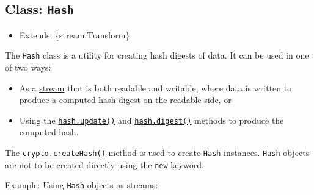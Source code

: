 \subsection{\texorpdfstring{Class:
\texttt{Hash}}{Class: Hash}}\label{class-hash}

\begin{itemize}
\tightlist
\item
  Extends: \{stream.Transform\}
\end{itemize}

The \texttt{Hash} class is a utility for creating hash digests of data.
It can be used in one of two ways:

\begin{itemize}
\tightlist
\item
  As a \href{stream.md}{stream} that is both readable and writable,
  where data is written to produce a computed hash digest on the
  readable side, or
\item
  Using the
  \hyperref[hashupdatedata-inputencoding]{\texttt{hash.update()}} and
  \hyperref[hashdigestencoding]{\texttt{hash.digest()}} methods to
  produce the computed hash.
\end{itemize}

The
\hyperref[cryptocreatehashalgorithm-options]{\texttt{crypto.createHash()}}
method is used to create \texttt{Hash} instances. \texttt{Hash} objects
are not to be created directly using the \texttt{new} keyword.

Example: Using \texttt{Hash} objects as streams:

